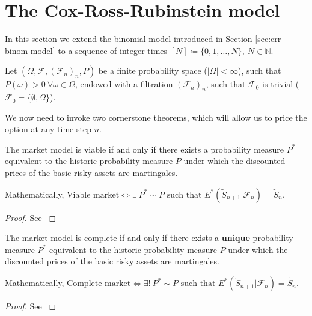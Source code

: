 \section{The Cox-Ross-Rubinstein model}
\label{sec:cox-ross-rubinstein}

In this section we extend the binomial model introduced in Section \ref{sec:crr-binom-model} to a sequence of integer times $ [N] \coloneqq \{ 0, 1, \dots, N \}, \  N \in \mathbb{N} $.

Let $ (\Omega, \mathcal{F}, (\mathcal{F}_n)_n, P) $ be a finite probability space ($ |\Omega| < \infty $), such that $ P(\omega) > 0 \  \forall \omega \in \Omega $, endowed with a filtration $ (\mathcal{F}_n)_n $, such that $ \mathcal{F}_0 $ is trivial ($ \mathcal{F}_0 = \{ \emptyset, \Omega \} $).

We now need to invoke two cornerstone theorems, which will allow us to price the option at any time step $ n $.

\begin{thm}
	\label{thm:crr-ftoap1}
	The market model is viable if and only if there exists a probability measure $ P^* $ equivalent to the historic probability measure $ P $ under which the discounted prices of the basic risky assets are martingales.
	
	Mathematically,
	$ \text{Viable market} \iff \exists \  P^* \sim P \text{ such that } E^*( \tilde{S}_{n+1} | \mathcal{F}_n ) = \tilde{S}_{n} $.
\end{thm}

\begin{proof}
	See \cite[page 6, Theorem 1.2.7]{Lamberton1996}
\end{proof}


\begin{thm}
	\label{thm:crr-ftoap2}
	The market model is complete if and only if there exists a \textbf{unique} probability measure $ P^* $ equivalent to the historic probability measure $ P $ under which the discounted prices of the basic risky assets are martingales.
	
	Mathematically,
	$ \text{Complete market} \iff \exists! \  P^* \sim P \text{ such that } E^*( \tilde{S}_{n+1} | \mathcal{F}_n ) = \tilde{S}_{n} $.
\end{thm}

\begin{proof}
	See \cite[page 9, Theorem 1.3.4]{Lamberton1996}
\end{proof}

